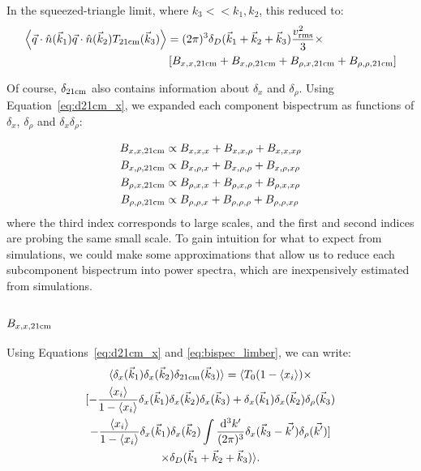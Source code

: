 In the squeezed-triangle limit, where $k_3 << k_1,k_2$, this reduced to:
\begin{equation}
\begin{split}
\left\langle \vec{q} \cdot \hat{n}(\vec{k}_1) \vec{q} \cdot \hat{n} (\vec{k}_2) T_{{\rm 21cm}}(\vec{k}_3) \right\rangle &= 
(2\pi)^3 \delta_D(\vec{k}_1 + \vec{k}_2 + \vec{k}_3) \frac{v_{\rm rms}^2}{3}  \times \\
& 
\left[ B_{x,x,{\rm 21cm}} + B_{x,\rho,{\rm 21cm}} + B_{\rho,x,{\rm 21cm}} +B_{\rho,\rho,{\rm 21cm}} \right]
\end{split}
\label{eq:component_bispectra}
\end{equation}

Of course, $\delta_{\rm 21cm}$ also contains information about $\delta_x$ and $\delta_{\rho}$. Using Equation~\ref{eq:d21cm_x}, we expanded each component bispectrum as functions of $\delta_x$, $\delta_{\rho}$ and $\delta_x\delta_{\rho}$:

\begin{equation}
\begin{split}
B_{x,x,{\rm 21cm}} &\propto B_{x,x,x} + B_{x,x,\rho} + B_{x,x,x\rho}\\
B_{x,\rho,{\rm 21cm}} &\propto B_{x,\rho,x} + B_{x,\rho,\rho} + B_{x,\rho,x\rho}\\
B_{\rho,x,{\rm 21cm}} &\propto B_{\rho,x,x} + B_{\rho,x,\rho} + B_{\rho,x,x\rho}\\
B_{\rho,\rho,{\rm 21cm}} &\propto B_{\rho,\rho,x} + B_{\rho,\rho,\rho} + B_{\rho,\rho,x\rho}\\
\end{split}
\label{eq:lots_of_bispectra}
\end{equation}
where the third index corresponds to large scales, and the first and second indices are probing the same small scale. To gain intuition for what to expect from simulations, we could make some approximations that allow us to reduce each subcomponent bispectrum into power spectra, which are inexpensively estimated from simulations.

\subsubsection{$B_{x,x,\rm 21cm}$}
\label{subsec:B_xx21}
Using Equations~\ref{eq:d21cm_x} and \ref{eq:bispec_limber}, we can write:
\begin{multline}
\langle \delta_x(\vec{k}_1) \delta_x(\vec{k}_2) \delta_{{\rm 21cm}}(\vec{k}_3) \rangle = 
\langle
T_0(1- \left\langle x_i \right\rangle ) \times \\
[
- \frac{\left\langle x_i \right\rangle}{1 - \left\langle x_i \right\rangle} \delta_x(\vec{k}_1) \delta_x(\vec{k}_2) \delta_x(\vec{k}_3) + \delta_x(\vec{k}_1) \delta_x(\vec{k}_2) \delta_{\rho}(\vec{k}_3)  \\
 - \frac{\left\langle x_i \right\rangle}{1 - \left\langle x_i \right\rangle} \delta_x(\vec{k}_1) \delta_x(\vec{k}_2) \int \frac{{\rm d^3}k'}{(2\pi)^3} \delta_x(\vec{k}_3 - \vec{k'})\delta_{\rho}(\vec{k'})
] \\
\times \delta_D(\vec{k}_1+\vec{k}_2+\vec{k}_3) 
\rangle .
\label{eq:B_xx21}
\end{multline}

